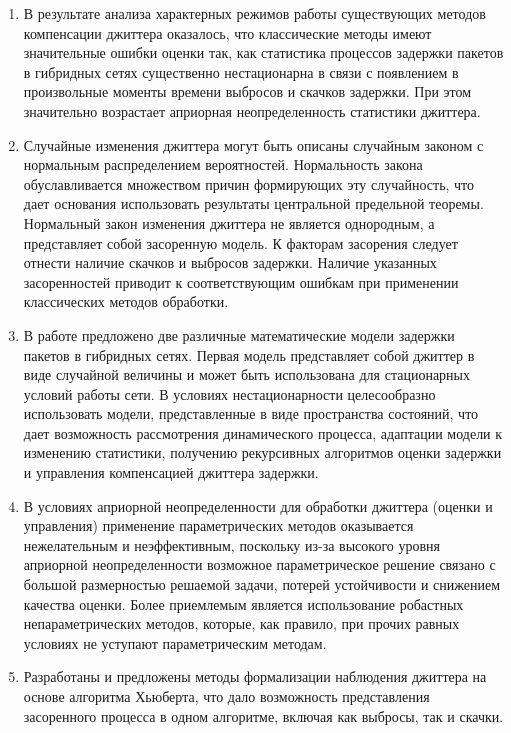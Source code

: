 \begin{enumerate}
 \item В результате анализа характерных режимов работы существующих методов компенсации джиттера оказалось, 
 что классические методы имеют значительные ошибки оценки так, 
 как статистика процессов задержки пакетов в гибридных сетях существенно нестационарна в связи с появлением в произвольные моменты времени выбросов и скачков задержки. 
 При этом значительно возрастает априорная неопределенность статистики джиттера.
 
 \item Случайные изменения джиттера могут быть описаны случайным законом с нормальным распределением вероятностей. 
 Нормальность закона обуславливается множеством причин формирующих эту случайность, что дает основания использовать результаты центральной предельной теоремы. 
 Нормальный закон изменения джиттера не является однородным, а представляет собой засоренную модель. 
 К факторам засорения следует отнести наличие скачков и выбросов задержки. 
 Наличие указанных засоренностей приводит к соответствующим ошибкам при применении классических методов обработки.
 
 \item В работе предложено две различные математические модели задержки пакетов в гибридных сетях. 
 Первая модель представляет собой джиттер в виде случайной величины и может быть использована для стационарных условий работы сети. 
 В условиях нестационарности целесообразно использовать модели, представленные в виде пространства состояний, 
 что дает возможность рассмотрения динамического процесса, адаптации модели к изменению статистики, 
 получению рекурсивных алгоритмов оценки задержки и управления компенсацией джиттера задержки.
 
 \item В условиях априорной неопределенности для обработки джиттера (оценки и управления) применение параметрических методов оказывается нежелательным и неэффективным, 
 поскольку из-за высокого уровня априорной неопределенности возможное параметрическое решение связано с большой размерностью решаемой задачи, потерей устойчивости и снижением качества оценки. 
 Более приемлемым является использование робастных непараметрических методов, 
 которые, как правило, при прочих равных условиях не уступают параметрическим методам.
 
 \item Разработаны и предложены методы формализации наблюдения джиттера на основе алгоритма Хьюберта, 
 что дало возможность представления засоренного процесса в одном алгоритме, включая как выбросы, так и скачки.
 

\end{enumerate}
